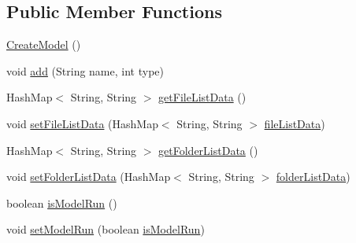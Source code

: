 \subsection*{Public Member Functions}
\begin{DoxyCompactItemize}
\item 
\hyperlink{classcom_1_1poly_1_1nlp_1_1filekommander_1_1views_1_1models_1_1_create_model_ad9a1a4f4e1188aa85d3014ae81812356}{Create\-Model} ()
\item 
void \hyperlink{classcom_1_1poly_1_1nlp_1_1filekommander_1_1views_1_1models_1_1_create_model_a9685c9d0f034bb7c4393e97df28fa575}{add} (String name, int type)
\item 
Hash\-Map$<$ String, String $>$ \hyperlink{classcom_1_1poly_1_1nlp_1_1filekommander_1_1views_1_1models_1_1_create_model_a9a772fafb3b314add60b903b8a594db0}{get\-File\-List\-Data} ()
\item 
void \hyperlink{classcom_1_1poly_1_1nlp_1_1filekommander_1_1views_1_1models_1_1_create_model_abf22e084ffc9a8c45371493effe4ab9c}{set\-File\-List\-Data} (Hash\-Map$<$ String, String $>$ \hyperlink{classcom_1_1poly_1_1nlp_1_1filekommander_1_1views_1_1models_1_1_create_model_ab7b2c78de5e244603bf942be06d1aa82}{file\-List\-Data})
\item 
Hash\-Map$<$ String, String $>$ \hyperlink{classcom_1_1poly_1_1nlp_1_1filekommander_1_1views_1_1models_1_1_create_model_a622712664c91b111696b19bce85c5c01}{get\-Folder\-List\-Data} ()
\item 
void \hyperlink{classcom_1_1poly_1_1nlp_1_1filekommander_1_1views_1_1models_1_1_create_model_a76f23d7e1b08b6565b418f494fd9bfee}{set\-Folder\-List\-Data} (Hash\-Map$<$ String, String $>$ \hyperlink{classcom_1_1poly_1_1nlp_1_1filekommander_1_1views_1_1models_1_1_create_model_a4ffeca4b461f31e7024727e67ed4f0cf}{folder\-List\-Data})
\item 
boolean \hyperlink{classcom_1_1poly_1_1nlp_1_1filekommander_1_1views_1_1models_1_1_create_model_a33c5eea740be35144d1e6e18e536473b}{is\-Model\-Run} ()
\item 
void \hyperlink{classcom_1_1poly_1_1nlp_1_1filekommander_1_1views_1_1models_1_1_create_model_a59c2e198b45a63d3835e92cf2deae6ad}{set\-Model\-Run} (boolean \hyperlink{classcom_1_1poly_1_1nlp_1_1filekommander_1_1views_1_1models_1_1_create_model_ac8bed5b351f8c89a81528625298453a3}{is\-Model\-Run})
\end{DoxyCompactItemize}

